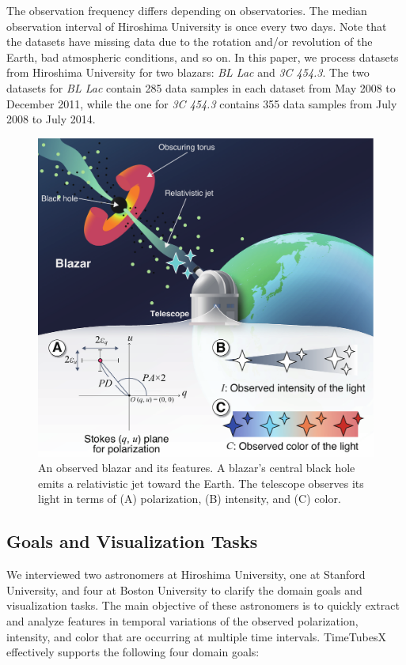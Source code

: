 The observation frequency differs depending on observatories.
The median observation interval of Hiroshima University is once every two days.
Note that the datasets have missing data due to the rotation and/or revolution of the Earth, bad atmospheric conditions, and so on.
In this paper, we process datasets from Hiroshima University for two blazars: \emph{BL Lac} and \emph{3C 454.3}. 
The two datasets for \emph{BL Lac} contain 285 data samples in each dataset from May 2008 to December 2011, while the one for \emph{3C 454.3} contains 355 data samples from July 2008 to July 2014.

\begin{figure}[tb]
    \centering
        \includegraphics[width=.99\linewidth]{figures/blazar_final.pdf}
    \caption{An observed blazar and its features. A blazar's central black hole emits a relativistic jet toward the Earth.
        The telescope observes its light in terms of (A) polarization, (B) intensity, and (C) color.}
    \label{fig:blazar}
\end{figure}

\subsection{Goals and Visualization Tasks}\label{sec:domainGoalsandTasks}
We interviewed two astronomers at Hiroshima University, one at Stanford University, and four at Boston University to clarify the domain goals and visualization tasks.
The main objective of these astronomers is 
to quickly extract and analyze features in temporal variations of the observed polarization, intensity, and color that are occurring at multiple time intervals. 
TimeTubesX effectively supports the following four domain goals:

